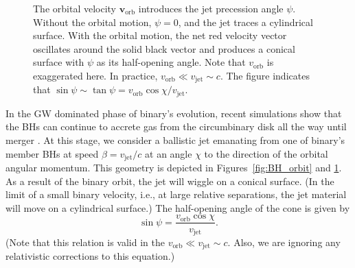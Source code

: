 \documentclass[a4paper,fleqn,usenatbib]{mnras}
\begin{document}
\begin{figure}
  \begin{center}
  \end{center}
  \caption{The orbital velocity $\mathbf{v}_\mathrm{orb}$
    introduces the jet precession angle $\psi$.  Without the orbital
    motion, $\psi=0$, and the jet traces a cylindrical surface.  With
    the orbital motion, the net red velocity vector oscillates around
    the solid black vector and produces a conical surface with $\psi$
    as its half-opening angle.  Note that $v_\mathrm{orb}$ is
    exaggerated here.  In practice, $v_\mathrm{orb}\ll
    v_\mathrm{jet}\sim c$.  The figure indicates that
    $\sin{\psi}\sim\tan{\psi}=v_\mathrm{orb}\cos{\chi}/v_\mathrm{jet}$.}
  \label{fig:jet}
\end{figure}

In the GW dominated phase of binary's evolution, recent simulations
show that the BHs can continue to accrete gas from the circumbinary
disk all the way until merger \citep{2015MNRAS.446L..36F}.  At this
stage, we consider a ballistic jet emanating from one of binary's
member BHs at speed $\beta=v_\mathrm{jet}/c$ at an angle $\chi$ to the
direction of the orbital angular momentum.  This geometry is depicted
in Figures~\ref{fig:BH_orbit} and \ref{fig:jet}.  As a result of the
binary orbit, the jet will wiggle on a conical surface.  (In the limit
of a small binary velocity, i.e., at large relative separations, the
jet material will move on a cylindrical surface.)  The half-opening
angle of the cone is given by \citep{1993ApJ...409..130R}
\begin{equation}
  \sin\psi = \frac{v_\mathrm{orb}\cos\chi}{v_\mathrm{jet}}.
\end{equation}
(Note that this relation is valid in the $v_\mathrm{orb}\ll
v_\mathrm{jet}\sim c$. Also, we are ignoring any relativistic
corrections to this equation.)
\end{document}
